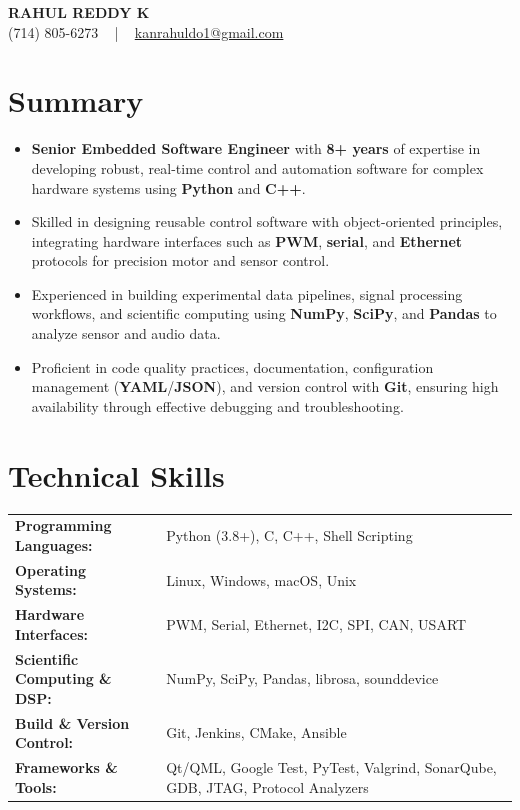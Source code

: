 \documentclass[letterpaper,11pt]{article}
\newcommand{\resumeItem}[1]{
  \item\footnotesize{
    {#1 \vspace{-2pt}}
  }
}
\newcommand{\resumeItemListStart}{\begin{itemize}[leftmargin=*]}
\newcommand{\resumeItemListEnd}{\end{itemize}\vspace{-5pt}}
\begin{document}
\begin{center}
    {\fontsize{14pt}{12pt}\selectfont \textbf{\MakeUppercase{Rahul Reddy K}}}\\ \vspace{2pt}
    \fontsize{10pt}{12pt}\selectfont (714) 805-6273 ~ | ~ \href{mailto:kanrahuldo1@gmail.com}{kanrahuldo1@gmail.com}~
    \vspace{-8pt}
\end{center}

\section{Summary}
\fontsize{9pt}{10pt}\selectfont
\resumeItemListStart
    \resumeItem{\textbf{Senior Embedded Software Engineer} with \textbf{8+ years} of expertise in developing robust, real-time control and automation software for complex hardware systems using \textbf{Python} and \textbf{C++}.}
    \resumeItem{Skilled in designing reusable control software with object-oriented principles, integrating hardware interfaces such as \textbf{PWM}, \textbf{serial}, and \textbf{Ethernet} protocols for precision motor and sensor control.}
    \resumeItem{Experienced in building experimental data pipelines, signal processing workflows, and scientific computing using \textbf{NumPy}, \textbf{SciPy}, and \textbf{Pandas} to analyze sensor and audio data.}
    \resumeItem{Proficient in code quality practices, documentation, configuration management (\textbf{YAML}/\textbf{JSON}), and version control with \textbf{Git}, ensuring high availability through effective debugging and troubleshooting.}
\resumeItemListEnd
\vspace{-6pt}

\section{Technical Skills}
        \vspace{-14pt}
        \begin{table}[h]
            \fontsize{9pt}{10pt}\selectfont
            \begin{tabular}{p{0.3\linewidth} p{0.7\linewidth}}
                \textbf{Programming Languages:} & Python (3.8+), C, C++, Shell Scripting \\
                \textbf{Operating Systems:} & Linux, Windows, macOS, Unix \\
                \textbf{Hardware Interfaces:} & PWM, Serial, Ethernet, I2C, SPI, CAN, USART \\
                \textbf{Scientific Computing \& DSP:} & NumPy, SciPy, Pandas, librosa, sounddevice \\
                \textbf{Build \& Version Control:} & Git, Jenkins, CMake, Ansible \\
                \textbf{Frameworks \& Tools:} & Qt/QML, Google Test, PyTest, Valgrind, SonarQube, GDB, JTAG, Protocol Analyzers \\
            \end{tabular}
        \end{table}
    \vspace{-15pt}
\end{document}
